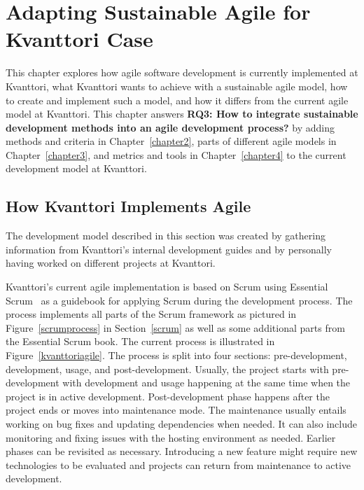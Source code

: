 \chapter{Adapting Sustainable Agile for Kvanttori Case}\label{chapter5}
This chapter explores how agile software development is currently implemented at Kvanttori, what Kvanttori wants to achieve with a sustainable agile model, how to create and implement such a model, and how it differs from the current agile model at Kvanttori. This chapter answers \textbf{RQ3: How to integrate sustainable development methods into an agile development process?} by adding methods and criteria in Chapter~\ref{chapter2}, parts of different agile models in Chapter~\ref{chapter3}, and metrics and tools in Chapter~\ref{chapter4} to the current development model at Kvanttori.

\section{How Kvanttori Implements Agile}\label{currentimplementation}
The development model described in this section was created by gathering information from Kvanttori's internal development guides and by personally having worked on different projects at Kvanttori.

Kvanttori's current agile implementation is based on Scrum using Essential Scrum~\cite{essentialscrum} as a guidebook for applying Scrum during the development process. The process implements all parts of the Scrum framework as pictured in Figure~\ref{scrumprocess} in Section~\ref{scrum} as well as some additional parts from the Essential Scrum book. The current process is illustrated in Figure~\ref{kvanttoriagile}. The process is split into four sections: pre-development, development, usage, and post-development. Usually, the project starts with pre-development with development and usage happening at the same time when the project is in active development. Post-development phase happens after the project ends or moves into maintenance mode. The maintenance usually entails working on bug fixes and updating dependencies when needed. It can also include monitoring and fixing issues with the hosting environment as needed. Earlier phases can be revisited as necessary. Introducing a new feature might require new technologies to be evaluated and projects can return from maintenance to active development.

